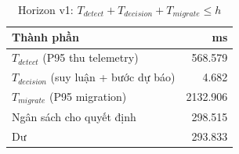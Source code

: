 \begin{table}[H]\centering\small
\caption{Horizon v1: $T_{detect}+T_{decision}+T_{migrate}\le h$}\label{tab:w10-horizon}
\begin{tabular}{lr}\toprule
Thành phần & ms \\\midrule
$T_{detect}$ (P95 thu telemetry) & 568.579 \\
$T_{decision}$ (suy luận + bước dự báo) & 4.682 \\
$T_{migrate}$ (P95 migration) & 2132.906 \\
Ngân sách cho quyết định & 298.515 \\
Dư & 293.833 \\
\bottomrule\end{tabular}
\end{table}
